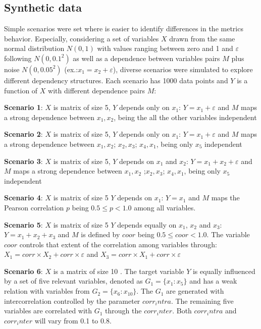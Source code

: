 \subsection{Synthetic data}

Simple scenarios were set where is easier to identify differences in the metrics behavior. Especially, considering a set of variables \(X\) drawn from the same normal distribution \(N(0, 1)\) with values ranging between zero and 1 and \(\varepsilon\) following \(N(0, 0.1^2)\) as well as a  dependence between variables pairs $M$ plus noise \(N(0, 0.05^2)\) (ex.:\(x_1 = x_2 + \varepsilon\)), diverse scenarios were simulated to explore different dependency structures. Each scenario has 1000 data points and \(Y\) is a function of \(X\) with different dependence pairs \(M\):

\textbf{Scenario 1}: \(X\) is matrix of size 5, \(Y\) depends only on \(x_1\): \(Y= x_1 +  \varepsilon\) and \(M\) maps a strong dependence between \(x_1, x_2\), being the all the other variables independent

\textbf{Scenario 2}:  \(X\) is matrix of size 5, \(Y\) depends only on \(x_1\): \(Y= x_1 +  \varepsilon\) and \(M\) maps a strong dependence between \(x_1, x_2\); \(x_2, x_3\); \(x_4, x_1\), being only \(x_5\) independent

\textbf{Scenario 3}:  \(X\) is matrix of size 5, \(Y\) depends on \(x_1\) and \(x_2\): \(Y= x_1 + x_2 + \varepsilon\) and \(M\) maps a strong dependence between \(x_1, x_2\) ;\(x_2, x_3\); \(x_4, x_1\), being only \(x_5\) independent

\textbf{Scenario 4}:  \(X\) is matrix of size 5 \(Y\) depends on \(x_1\): \(Y = x_1\)  and \(M\) maps the Pearson correlation \(p\) being \(0.5 \leq p < 1.0
\) among all variables. 

\textbf{Scenario 5}:  \(X\) is matrix of size 5 \(Y\) depends equally on \(x_1\), \(x_2\) and \(x_3\): \(Y = x_1 + x_2 + x_3\)  and \(M\) is defined by \(coor\) being \(0.5 \leq coor < 1.0
\).  The variable \(coor\) controls that extent of the correlation among variables through: \(X_1 = corr \times X_2 + corr \times \varepsilon\)
and \(X_3 = corr \times X_1 + corr \times \varepsilon\) 

\textbf{Scenario 6}: \(X\) is a matrix of size 10 . The target variable \(Y\) is equally influenced by a set of five relevant variables, denoted as \(G_1 = \{x_1:x_5\}\) and has a weak relation with variables from \(G_2 = \{x_6: x_10\}\). The \(G_1\) are generated with intercorrelation controlled by the parameter \(corr_intra\). The remaining five variables are correlated with \(G_1\) through the \(corr_inter\). Both \(corr_intra\) and \(corr_inter\) will vary from 0.1 to 0.8.












